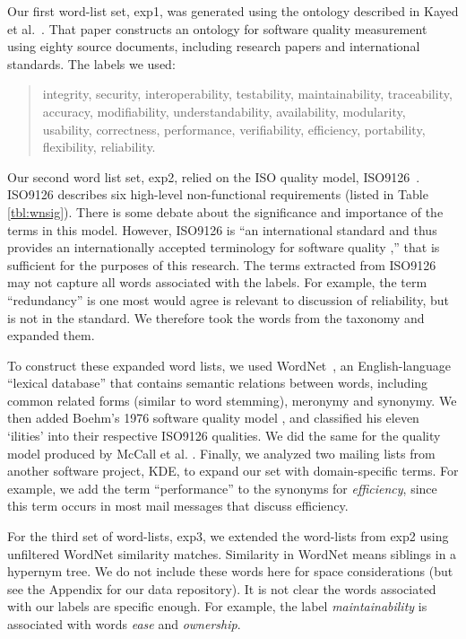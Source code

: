\documentclass[]{sig-alternate}
\begin{document}
Our first word-list set, \textsf{exp1}, was generated using the ontology described in Kayed et al.~\cite{5072519}. 
That paper constructs an ontology for software quality measurement using eighty source documents, including research papers and international standards. 
The labels we used:
\begin{quotation}
\small \noindent \textsf{
integrity, security,
interoperability, testability, maintainability, traceability,
accuracy, modifiability, understandability, availability, modularity,
usability, correctness, performance, verifiability, efficiency,
portability, flexibility, reliability.
}
\end{quotation}

Our second word list set, \textsf{exp2}, relied on the ISO quality model, ISO9126~\cite{iso9126}. 
ISO9126 describes six high-level non-functional requirements (listed in Table \ref{tbl:wnsig}). 
There is some debate about the significance and importance of the terms in this model. 
However, ISO9126 is ``an international standard and thus provides an internationally accepted terminology for software quality \cite[p. 58]{Boegh2008},'' that is sufficient for the purposes of this research. 
The terms extracted from ISO9126 may not capture all words associated with the labels.  
For example, the term ``redundancy'' is one most would agree is relevant to discussion of reliability, but is not in the standard. 
We therefore took the words from the taxonomy and expanded them.

To construct these expanded word lists, we used WordNet~\cite{Fellbaum1998}, an English-language ``lexical database'' that contains semantic relations between words, including common related forms (similar to word stemming), meronymy and synonymy. 
We then added Boehm's 1976 software quality model \cite{Boehm+:1976:ICSE}, and classified his eleven `ilities' into their respective ISO9126 qualities. 
We did the same for the quality model produced by McCall et al. \cite{mccall1977}. 
Finally, we analyzed two mailing lists from another software project, KDE, to expand our set with domain-specific terms. 
For example, we add the term ``performance'' to the synonyms for \emph{efficiency}, since this term occurs in most mail messages that discuss efficiency.

For the third set of word-lists,  \textsf{exp3}, we extended the word-lists from \textsf{exp2} using unfiltered WordNet similarity matches. 
Similarity in WordNet means siblings in a hypernym tree. 
We do not include these words here for space considerations (but see the Appendix for our data repository). 
It is not clear the words associated with our labels are specific enough. For example, the label \emph{maintainability} is associated with words \emph{ease} and \emph{ownership}.
\end{document}
